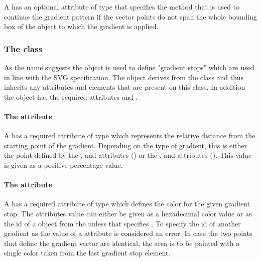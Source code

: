 A \GradientBase has an optional attribute  of type
\GradientSpreadMethod that specifies the method that is
used to continue the gradient pattern if the vector points do not span the whole
bounding box of the object to which the gradient is applied. 

%
%

\subsubsection{The  class}
\label{gradientstop-class}

As the name suggests the \GradientStop object is used to define "gradient stops" 
which are used in line with the SVG specification.
The \GradientStop object derives from the \SBase class and thus inherits
any attributes and elements that are present on this class.
In addition the \GradientStop object has the required attributes 
and .

\paragraph{The \fixttspace{} attribute}

A \GradientStop has a required attribute  of type
\RelAbsVector which represents the relative distance from the starting point of 
the gradient. Depending on the type of gradient, this is either the point 
defined by the , and  attributes (\LinearGradient) 
or the ,  and  attributes (\RadialGradient). 
This value is given as a positive percentage value.

\paragraph{The \fixttspace{} attribute}

A \GradientStop has a required attribute  of type
 which defines the color for the given gradient stop. The
attributes value can either be given as a hexadecimal color value or as the id
of a \ColorDefinition object from the \ListOfColorDefinitions unless that \ColorDefinition specifies . 
To specify the id of another gradient as the value of a  attribute is 
considered an error.
In case the two points that define the gradient vector are identical, the area
is to be painted with a single color taken from the last gradient stop element.

